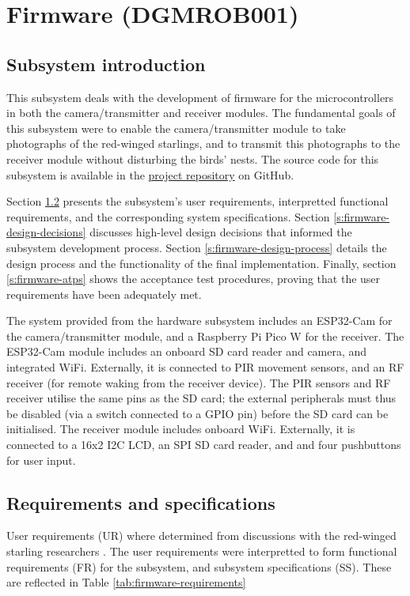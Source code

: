 \documentclass[class=report,11pt,crop=false]{standalone}
\begin{document}
\ifstandalone
\tableofcontents
\fi
\chapter{Firmware (DGMROB001) \label{ch:firmware}}
\section{Subsystem introduction}

This subsystem deals with the development of firmware for the microcontrollers in both the camera/transmitter and receiver modules. The fundamental goals of this subsystem were to enable the camera/transmitter module to take photographs of the red-winged starlings, and to transmit this photographs to the receiver module without disturbing the birds' nests. The source code for this subsystem is available in the \href{https://github.com/rothdu/EEE4113F-Group13-2024}{project repository} on GitHub.

Section \ref{s:firmware-requirements} presents the subsystem's user requirements, interpretted functional requirements, and the corresponding system specifications. Section \ref{s:firmware-design-decisions} discusses high-level design decisions that informed the subsystem development process. Section \ref{s:firmware-design-process} details the design process and the functionality of the final implementation. Finally, section \ref{s:firmware-atps} shows the acceptance test procedures, proving that the user requirements have been adequately met.

The system provided from the hardware subsystem includes an ESP32-Cam for the camera/transmitter module, and a Raspberry Pi Pico W for the receiver. The ESP32-Cam module includes an onboard SD card reader and camera, and integrated WiFi. Externally, it is connected to PIR movement sensors, and an RF receiver (for remote waking from the receiver device). The PIR sensors and RF receiver utilise the same pins as the SD card; the external peripherals must thus be disabled (via a switch connected to a GPIO pin) before the SD card can be initialised. The receiver module includes onboard WiFi. Externally, it is connected to a 16x2 I2C LCD, an SPI SD card reader, and and four pushbuttons for user input.

\section{Requirements and specifications} \label{s:firmware-requirements}
User requirements (UR) where determined from discussions with the red-winged starling researchers \cite{hofmeyer2024private}. The user requirements were interpretted to form functional requirements (FR) for the subsystem, and subsystem specifications (SS). These are reflected in Table \ref{tab:firmware-requirements}
\end{document}
